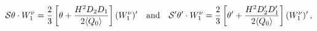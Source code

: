\begin{equation*}\label{eq:prop2} {\cal
S}\theta\cdot W^{\nu}_{1}=\frac{2}{3}\left[
\theta+\frac{H^{2}D_{2}D_{1}}{2\langle Q_{0}\rangle}\right](
W^{\nu}_{1} )' \quad\mbox{and}\quad{\cal S}'\theta'\cdot
W^{\nu}_{1}=\frac{2}{3}\left[
\theta'+\frac{H^{2}D'_{2}D'_{1}}{2\langle
Q_{0}\rangle}\right](W^{\nu}_{1} )'\,,
\end{equation*}

